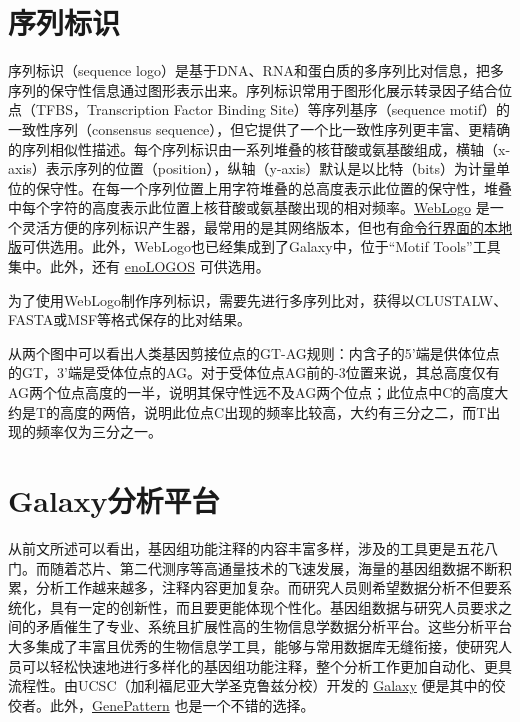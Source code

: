 \section{序列标识}
序列标识（sequence logo）是基于DNA、RNA和蛋白质的多序列比对信息，把多序列的保守性信息通过图形表示出来。序列标识常用于图形化展示转录因子结合位点（TFBS，Transcription Factor Binding Site）等序列基序（sequence motif）的一致性序列（consensus  sequence），但它提供了一个比一致性序列更丰富、更精确的序列相似性描述。每个序列标识由一系列堆叠的核苷酸或氨基酸组成，横轴（x-axis）表示序列的位置（position），纵轴（y-axis）默认是以比特（bits）为计量单位的保守性。在每一个序列位置上用字符堆叠的总高度表示此位置的保守性，堆叠中每个字符的高度表示此位置上核苷酸或氨基酸出现的相对频率。\href{http://weblogo.threepluson.com}{WebLogo} 是一个灵活方便的序列标识产生器，最常用的是其网络版本，但也有\href{http://code.google.com/p/weblogo/}{命令行界面的本地版}可供选用。此外，WebLogo也已经集成到了Galaxy中，位于“Motif Tools”工具集中。此外，还有 \href{http://www.benoslab.pitt.edu/cgi-bin/enologos/enologos.cgi}{enoLOGOS} 可供选用。

为了使用WebLogo制作序列标识，需要先进行多序列比对，获得以CLUSTALW、FASTA或MSF等格式保存的比对结果。

从两个图中可以看出人类基因剪接位点的GT-AG规则：内含子的5'端是供体位点的GT，3'端是受体位点的AG。对于受体位点AG前的-3位置来说，其总高度仅有AG两个位点高度的一半，说明其保守性远不及AG两个位点；此位点中C的高度大约是T的高度的两倍，说明此位点C出现的频率比较高，大约有三分之二，而T出现的频率仅为三分之一。

\section{Galaxy分析平台} 
从前文所述可以看出，基因组功能注释的内容丰富多样，涉及的工具更是五花八门。而随着芯片、第二代测序等高通量技术的飞速发展，海量的基因组数据不断积累，分析工作越来越多，注释内容更加复杂。而研究人员则希望数据分析不但要系统化，具有一定的创新性，而且要更能体现个性化。基因组数据与研究人员要求之间的矛盾催生了专业、系统且扩展性高的生物信息学数据分析平台。这些分析平台大多集成了丰富且优秀的生物信息学工具，能够与常用数据库无缝衔接，使研究人员可以轻松快速地进行多样化的基因组功能注释，整个分析工作更加自动化、更具流程性。由UCSC（加利福尼亚大学圣克鲁兹分校）开发的 \href{https://main.g2.bx.psu.edu/}{Galaxy} 便是其中的佼佼者。此外，\href{http://www.broadinstitute.org/cancer/software/genepattern/}{GenePattern} 也是一个不错的选择。


